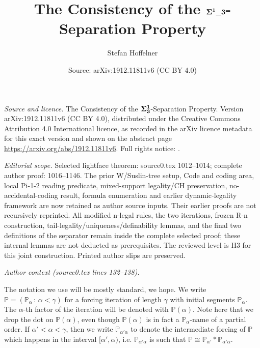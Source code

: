 \documentclass[10pt,a4paper]{amsart}
\title[The Consistency of the $\bf{\Sigma^1\_3}$-Separation Property]{The Consistency of the $\bf{\Sigma^1\_3}$-Separation Property}
\author{Stefan Hoffelner}
\date{Source: arXiv:1912.11811v6 (CC BY 4.0)}
\newcommand{\forceP}{\mathbb{P}}
\begin{document}
\maketitle

{\raggedright \noindent\emph{Source and licence.} The Consistency of the $\bf{\Sigma^1_3}$-Separation Property. Version arXiv:1912.11811v6 (CC BY 4.0), distributed under the Creative Commons Attribution 4.0 International licence, as recorded in the arXiv licence metadata for this exact version and shown on the abstract page \url{https://arxiv.org/abs/1912.11811v6}. Full rights notice: .\par\smallskip\par}

\noindent\textit{Editorial scope.} Selected lightface theorem: source0.tex 1012--1014; complete author proof: 1016--1146. The prior W/Suslin-tree setup, Code and coding area, local Pi-1-2 reading predicate, mixed-support legality/CH preservation, no-accidental-coding result, formula enumeration and earlier dynamic-legality framework are now retained as author source inputs. Their earlier proofs are not recursively reprinted. All modified n-legal rules, the two iterations, frozen R-n construction, tail-legality/uniqueness/definability lemmas, and the final two definitions of the separator remain inside the complete selected proof; these internal lemmas are not deducted as prerequisites. The reviewed level is H3 for this joint construction. Printed author slips are preserved.\par\smallskip
\par\medskip\noindent\textit{Author context (source0.tex lines 132--138).}\par\smallskip
The notation we use will be mostly standard, we hope. We write $\forceP=(\forceP_{\alpha} \, : \, \alpha < \gamma)$ for a forcing iteration of length $\gamma$ with initial segments $\forceP_{\alpha}$. The $\alpha$-th factor of the iteration will be denoted with $\forceP(\alpha)$. Note here that we drop the dot on $\forceP(\alpha)$, even though $\forceP(\alpha)$ is in fact a $\forceP_{\alpha}$-name of a partial order. 
If $\alpha' < \alpha < \gamma$, then we write $\forceP_{\alpha' \alpha}$ to denote the intermediate forcing of $\forceP$ which happens in the interval $[\alpha',\alpha)$, i.e. $\forceP_{\alpha' \alpha}$ is such that 
$\forceP \cong \forceP_{\alpha'} \ast \forceP_{\alpha' \alpha}$.
\end{document}
